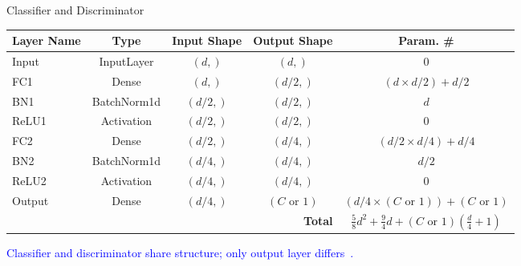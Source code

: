\documentclass[aspectratio=169]{beamer}
\let\oldcite\cite %
\renewcommand{\cite}[1]{{\tiny\oldcite{#1}}}
\begin{document}
\begin{frame}{Classifier and Discriminator}
\begin{table}
\begin{tabularx}{\linewidth}{lcccc}
\toprule
\textbf{Layer Name} & \textbf{Type} & \textbf{Input Shape} & \textbf{Output Shape} & \textbf{Param. \#} \\
\midrule
Input   & InputLayer  & $(d,)$ & $(d,)$ & 0 \\
FC1     & Dense       & $(d,)$ & $(d/2,)$ & $(d \times d/2)+d/2$ \\
BN1     & BatchNorm1d & $(d/2,)$ & $(d/2,)$ & $d$ \\
ReLU1   & Activation  & $(d/2,)$ & $(d/2,)$ & 0 \\
FC2     & Dense       & $(d/2,)$ & $(d/4,)$ & $(d/2 \times d/4)+d/4$ \\
BN2     & BatchNorm1d & $(d/4,)$ & $(d/4,)$ & $d/2$ \\
ReLU2   & Activation  & $(d/4,)$ & $(d/4,)$ & 0 \\
Output  & Dense       & $(d/4,)$ & $(C \text{ or } 1)$ & $(d/4 \times (C \text{ or } 1))+(C \text{ or } 1)$ \\
\midrule
\multicolumn{4}{r}{\textbf{Total}} & $\frac{5}{8}d^2 + \frac{9}{4}d + (C \text{ or } 1)\left(\frac{d}{4} + 1\right)$ \\
\midrule
\end{tabularx}
\end{table}
\begin{center}
    \textcolor{blue}{Classifier and discriminator share structure; only output layer differs~\cite{ganin2016domain}.}
\end{center}
\end{frame}
\end{document}
